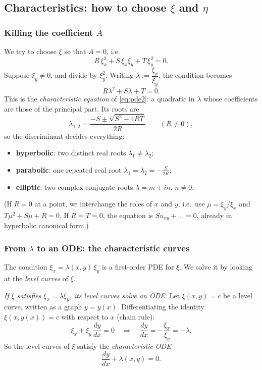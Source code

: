 \documentclass[11pt]{article}
\theoremstyle{plain}
\theoremstyle{definition}
\theoremstyle{remark}
\begin{document}
\subsection{Characteristics: how to choose $\xi$ and $\eta$}

\subsubsection{Killing the coefficient $A$}
We try to choose $\xi$ so that $A = 0$, i.e.
$$ R\,\xi_x^2 + S\,\xi_x\xi_y + T\,\xi_y^2 = 0. $$
Suppose $\xi_y \neq 0$, and divide by $\xi_y^2$. Writing $\lambda := \dfrac{\xi_x}{\xi_y}$, the condition becomes
\begin{equation}\label{eq:charq}
R\lambda^2 + S\lambda + T = 0.
\end{equation}
This is the \emph{characteristic equation} of \eqref{eq:pde2}: a quadratic in $\lambda$ whose coefficients are those of the principal part. Its roots are
$$ \lambda_{1,2} = \frac{-S \pm \sqrt{S^2 - 4RT}}{2R} \qquad (R \neq 0), $$
so the discriminant decides everything:
\begin{itemize}
    \item \textbf{hyperbolic}: two distinct real roots $\lambda_1 \neq \lambda_2$;
    \item \textbf{parabolic}: one repeated real root $\lambda_1 = \lambda_2 = -\frac{S}{2R}$;
    \item \textbf{elliptic}: two complex conjugate roots $\lambda = m \pm in$, $n \neq 0$.
\end{itemize}
(If $R = 0$ at a point, we interchange the roles of $x$ and $y$, i.e.\ use $\mu = \xi_y/\xi_x$ and $T\mu^2 + S\mu + R = 0$. If $R = T = 0$, the equation is $S u_{xy} + \dots = 0$, already in hyperbolic canonical form.)

\subsubsection{From $\lambda$ to an ODE: the characteristic curves}
The condition $\xi_x = \lambda(x,y)\,\xi_y$ is a first-order PDE for $\xi$. We solve it by looking at the \emph{level curves} of $\xi$.

\emph{If $\xi$ satisfies $\xi_x = \lambda\xi_y$, its level curves solve an ODE.} Let $\xi(x,y) = c$ be a level curve, written as a graph $y = y(x)$. Differentiating the identity $\xi(x,y(x)) = c$ with respect to $x$ (chain rule):
$$ \xi_x + \xi_y\,\frac{dy}{dx} = 0 \quad\Longrightarrow\quad \frac{dy}{dx} = -\frac{\xi_x}{\xi_y} = -\lambda. $$
So the level curves of $\xi$ satisfy the \emph{characteristic ODE}
\begin{equation}\label{eq:charode}
\frac{dy}{dx} + \lambda(x,y) = 0.
\end{equation}
\end{document}
